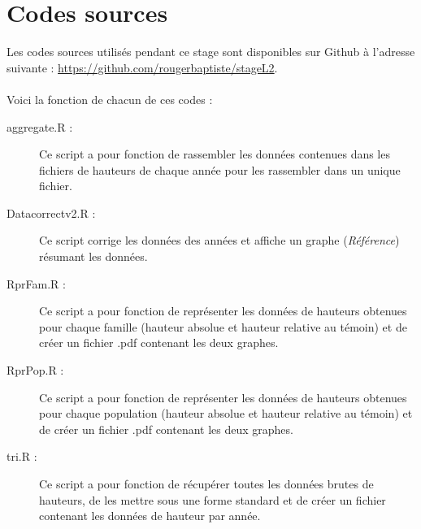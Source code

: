 \documentclass[12pt,a4paper]{article}
\begin{document}
				
	
	
	
	\appendix
	
	\section{Codes sources}
	\label{scripts}
	Les codes sources utilisés pendant ce stage sont disponibles sur Github à l'adresse suivante : \url{https://github.com/rougerbaptiste/stageL2}.\\~\\
	Voici la fonction de chacun de ces codes :
	\begin{description}
		\item [aggregate.R :] Ce script a pour fonction de rassembler les données contenues dans les fichiers de hauteurs de chaque année pour les rassembler dans un unique fichier.
		\item [Datacorrectv2.R :] Ce script corrige les données des années et affiche un graphe (\textit{Référence}) résumant les données.
		\item [RprFam.R :] Ce script a pour fonction de représenter les données de hauteurs obtenues pour chaque famille (hauteur absolue et hauteur relative au témoin) et de créer un fichier .pdf contenant les deux graphes.
		\item [RprPop.R :] Ce script a pour fonction de représenter les données de hauteurs obtenues pour chaque population (hauteur absolue et hauteur relative au témoin) et de créer un fichier .pdf contenant les deux graphes.
		\item [tri.R :] Ce script a pour fonction de récupérer toutes les données brutes de hauteurs, de les mettre sous une forme standard et de créer un fichier contenant les données de hauteur par année.
		
	\end{description}
\end{document}
